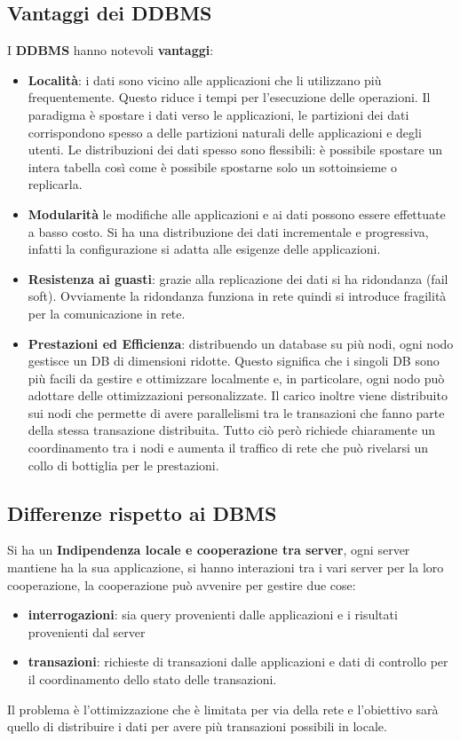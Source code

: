 \subsection{Vantaggi dei DDBMS}
I \textbf{DDBMS} hanno notevoli \textbf{vantaggi}:
\begin{itemize}
    \item \textbf{Località}: i dati sono vicino alle applicazioni che li
          utilizzano più frequentemente. Questo riduce i tempi per l'esecuzione
          delle operazioni. Il paradigma è spostare i dati verso le
          applicazioni, le partizioni dei dati corrispondono spesso a delle
          partizioni naturali delle applicazioni e degli utenti. Le
          distribuzioni dei dati spesso sono flessibili: è possibile spostare un
          intera tabella così come è possibile spostarne solo un sottoinsieme
          o replicarla.
    \item \textbf{Modularità} le modifiche alle applicazioni e ai dati possono
          essere effettuate a basso costo. Si ha una distribuzione dei dati incrementale e
          progressiva, infatti la configurazione si adatta alle esigenze delle applicazioni.
    \item \textbf{Resistenza ai guasti}: grazie alla replicazione dei dati si ha 
        ridondanza (fail soft). Ovviamente la ridondanza funziona in rete quindi 
        si introduce fragilità per la comunicazione in rete.
    \item \textbf{Prestazioni ed Efficienza}: distribuendo un database su più
          nodi, ogni nodo gestisce un DB di dimensioni ridotte. Questo
          significa che i singoli DB sono più facili da gestire e ottimizzare
          localmente e, in particolare, ogni nodo può adottare delle
          ottimizzazioni personalizzate. Il carico inoltre viene distribuito
          sui nodi che permette di avere parallelismi tra le transazioni che fanno 
          parte della stessa transazione distribuita. 
          Tutto ciò però richiede chiaramente un coordinamento tra i
          nodi e aumenta il traffico di rete che può rivelarsi un collo di
          bottiglia per le prestazioni.
\end{itemize}

\subsection{Differenze rispetto ai DBMS}
Si ha un \textbf{Indipendenza locale e cooperazione tra server}, ogni server 
mantiene ha la sua applicazione, si hanno interazioni tra i vari server per la 
loro cooperazione, la cooperazione può avvenire per gestire due cose:
\begin{itemize}
  \item \textbf{interrogazioni}: sia query provenienti dalle applicazioni e 
  i risultati provenienti dal server
  \item \textbf{transazioni}: richieste di transazioni dalle applicazioni  e 
  dati di controllo per il coordinamento dello stato delle transazioni.
\end{itemize}
Il problema è l'ottimizzazione che è limitata per via della rete e l'obiettivo 
sarà quello di distribuire i dati per avere più transazioni possibili in locale.

